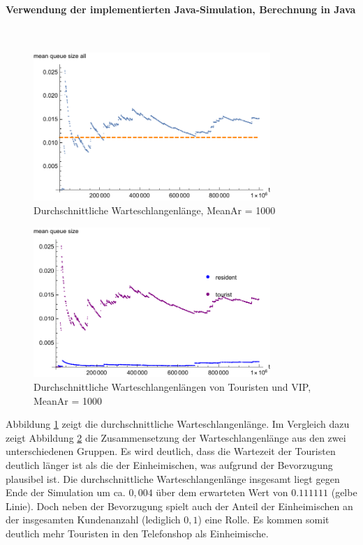 \paragraph{Verwendung der implementierten Java-Simulation, Berechnung in Java}
\label{JavaVIPPhone1000}
\\
\begin{figure}[htpb]
	\centering
	\includegraphics[width=0.8\textwidth]{abbildungen/1_Phone_VIP/Arrival_1000_Serve_100_dur_1000000_Skip_0/MeanQueueSizeAll.pdf}
	\caption{Durchschnittliche Warteschlangenlänge, MeanAr = 1000}
	\label{fig:MQSVIP1000ALL}
\end{figure}

\begin{figure}[htpb]
	\centering
	\includegraphics[width=0.8\textwidth]{abbildungen/1_Phone_VIP/Arrival_1000_Serve_100_dur_1000000_Skip_0/MeanQueueSizeTouristAndResident.pdf}
	\caption{Durchschnittliche Warteschlangenlängen von Touristen und VIP, MeanAr = 1000}
	\label{fig:MQSVIP1000VGL}
\end{figure}

Abbildung \ref{fig:MQSVIP1000ALL} zeigt die durchschnittliche Warteschlangenlänge. Im Vergleich dazu zeigt Abbildung \ref{fig:MQSVIP1000VGL} die Zusammensetzung der Warteschlangenlänge aus den zwei unterschiedenen Gruppen. Es wird deutlich, dass die Wartezeit der Touristen deutlich länger ist als die der Einheimischen, was aufgrund der Bevorzugung plausibel ist. Die durchschnittliche Warteschlangenlänge insgesamt liegt gegen Ende der Simulation um ca. $0,004$ über dem erwarteten Wert von $0.111111$ (gelbe Linie). Doch neben der Bevorzugung spielt auch der Anteil der Einheimischen an der insgesamten Kundenanzahl (lediglich $0,1$) eine Rolle. Es kommen somit deutlich mehr Touristen in den Telefonshop als Einheimische.

